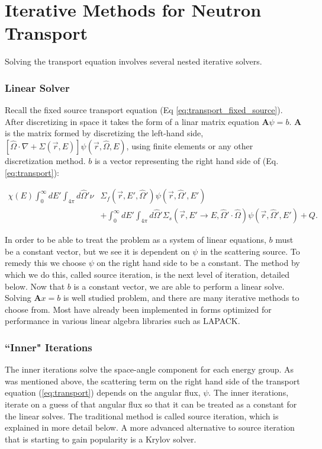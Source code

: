 
\section{Iterative Methods for Neutron Transport}
Solving the transport equation involves several nested iterative solvers. 
\subsubsection{Linear Solver}
Recall the fixed source transport equation (Eq \ref{eq:transport_fixed_source}). After discretizing in space it takes the form of a linar matrix equation $\textbf{A}\psi = b$. $\textbf{A}$ is the matrix formed by discretizing the left-hand side, $[\hat{\Omega} \cdot \nabla + \Sigma(\vec{r}, E)]\psi(\vec{r}, \hat{\Omega}, E)$, using finite elements or any other discretization method. $b$ is a vector representing the right hand side of (Eq. \ref{eq:transport}): 

\begin{align}
\chi(E) \int_0^\infty dE'  \int_{4\pi} d\hat{\Omega}' \nu &\Sigma_{f}(\vec{r}, E', \hat{\Omega}')\psi(\vec{r}, \hat{\Omega}', E') \nonumber \\ &+ \int_0^\infty dE' \int_{4\pi} d\hat{\Omega}' \Sigma_s(\vec{r}, E' \rightarrow E, \hat{\Omega}' \cdot \hat{\Omega})\psi(\vec{r}, \hat{\Omega}', E')  + Q. \nonumber
\end{align}

In order to be able to treat the problem as a system of linear equations, $b$ must be a constant vector, but we see it is dependent on $\psi$ in the scattering source. To remedy this we choose $\psi$ on the right hand side to be a constant. The method by which we do this, called source iteration, is the next level of iteration, detailed below. Now that $b$ is a constant vector, we are able to perform a linear solve. Solving $\textbf{A}x = b$ is well studied problem, and there are many iterative methods to choose from. Most have already been implemented in forms optimized for performance in various linear algebra libraries such as LAPACK.

\subsubsection{``Inner" Iterations}
The inner iterations solve the space-angle component for each energy group. As was mentioned above, the scattering term on the right hand side of the transport equation (\ref{eq:transport}) depends on the angular flux, $\psi$. The inner iterations, iterate on a guess of that angular flux so that it can be treated as a constant for the linear solves. The traditional method is called source iteration, which is explained in more detail below. A more advanced alternative to source iteration that is starting to gain popularity is a Krylov solver. 

